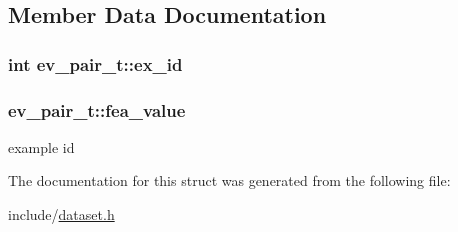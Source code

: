 \subsection{Member Data Documentation}
\hypertarget{structev__pair__t_aed493fca94855b5ba8081d4e1a7b28f1}{
\subsubsection[{ex\+\_\+id}]{\setlength{\rightskip}{0pt plus 5cm}int ev\+\_\+pair\+\_\+t\+::ex\+\_\+id}}\label{structev__pair__t_aed493fca94855b5ba8081d4e1a7b28f1}
\hypertarget{structev__pair__t_ab029b4bacf7dc6db2fee53091f5f8063}{
\subsubsection[{fea\+\_\+value}]{ ev\+\_\+pair\+\_\+t\+::fea\+\_\+value}}\label{structev__pair__t_ab029b4bacf7dc6db2fee53091f5f8063}
example id 

The documentation for this struct was generated from the following file\+:\begin{DoxyCompactItemize}
\item 
include/\hyperlink{dataset_8h}{dataset.\+h}\end{DoxyCompactItemize}
